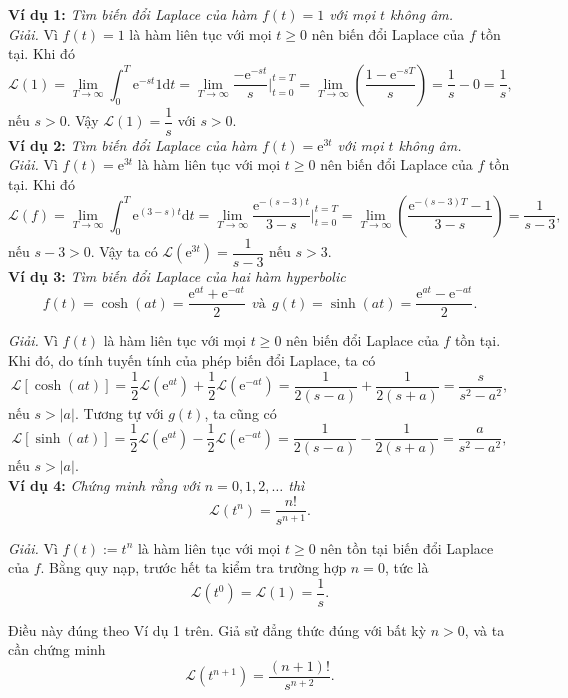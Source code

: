 \documentclass[10pt, a4paper]{article}
\begin{document}
	\textbf{Ví dụ 1:} \textit{Tìm biến đổi Laplace của hàm $f(t)=1$ với mọi $t$ không âm.}\\
	
	\textit{Giải.} Vì $f(t)=1$ là hàm liên tục với mọi $t\ge0$ nên biến đổi Laplace của $f$ tồn tại. Khi đó $$\mathcal L(1)=\lim_{T\to\infty}\int_0^T\mathrm e^{-st}1\mathrm dt=\lim_{T\to\infty}\dfrac{-\mathrm e^{-st}}{s}\Bigg|_{t=0}^{t=T}=\lim_{T\to\infty}\left(\frac{1-\mathrm e^{-sT}}{s}\right)=\frac1s-0=\frac1s,$$
	nếu $s>0$. Vậy $\mathcal L(1)=\dfrac1s$ với $s>0$.\\
	
	\textbf{Ví dụ 2:} \textit{Tìm biến đổi Laplace của hàm $f(t)=\mathrm e^{3t}$ với mọi $t$ không âm.}\\
	
	\textit{Giải.} Vì $f(t)=\mathrm e^{3t}$ là hàm liên tục với mọi $t\ge0$ nên biến đổi Laplace của $f$ tồn tại. Khi đó $$\mathcal L(f)=\lim_{T\to\infty}\int_0^T\mathrm e^{(3-s)t}\mathrm dt=\lim_{T\to\infty}\dfrac{\mathrm e^{-(s-3)t}}{3-s}\Bigg|_{t=0}^{t=T}=\lim_{T\to\infty}\left(\frac{\mathrm e^{-(s-3)T}-1}{3-s}\right)=\frac1{s-3},$$
	nếu $s-3>0$. Vậy ta có $\mathcal L(\mathrm e^{3t})=\dfrac{1}{s-3}$ nếu $s>3$.\\
	
	\textbf{Ví dụ 3:} \textit{Tìm biến đổi Laplace của hai hàm hyperbolic} $$f(t)=\cosh(at)=\frac{\mathrm e^{at}+\mathrm e^{-at}}{2}~~\textit{và}~~g(t)=\sinh(at)=\frac{\mathrm e^{at}-\mathrm e^{-at}}{2}.$$
	
	\textit{Giải.} Vì $f(t)$ là hàm liên tục với mọi $t\ge0$ nên biến đổi Laplace của $f$ tồn tại. Khi đó, do tính tuyến tính của phép biến đổi Laplace, ta có $$\mathcal L[\cosh(at)]=\frac12\mathcal L(\mathrm e^{at})+\frac12\mathcal L(\mathrm e^{-at})=\frac{1}{2(s-a)}+\frac{1}{2(s+a)}=\frac{s}{s^2-a^2},$$
	nếu $s>|a|$. Tương tự với $g(t)$, ta cũng có $$\mathcal L[\sinh(at)]=\frac12\mathcal L(\mathrm e^{at})-\frac12\mathcal L(\mathrm e^{-at})=\frac{1}{2(s-a)}-\frac{1}{2(s+a)}=\frac{a}{s^2-a^2},$$
	nếu $s>|a|.$\\
	
	\textbf{Ví dụ 4:} \textit{Chứng minh rằng với $n=0,1,2,\ldots$ thì} $$\mathcal L(t^n)=\frac{n!}{s^{n+1}}.$$
	
	\textit{Giải.} Vì $f(t):=t^n$ là hàm liên tục với mọi $t\ge0$ nên tồn tại biến đổi Laplace của $f$. Bằng quy nạp, trước hết ta kiểm tra trường hợp $n=0$, tức là $$\mathcal L(t^0)=\mathcal L(1)=\frac1s.$$
	
	Điều này đúng theo Ví dụ 1 trên. Giả sử đẳng thức đúng với bất kỳ $n>0$, và ta cần chứng minh $$\mathcal L(t^{n+1})=\frac{(n+1)!}{s^{n+2}}.$$
	
\end{document}
